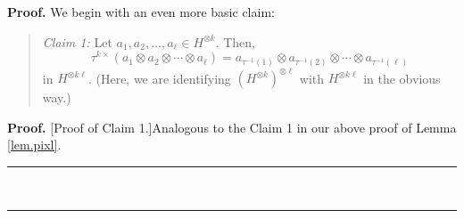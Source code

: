 \documentclass[numbers=enddot,12pt,final,onecolumn,notitlepage]{scrartcl}%
\theoremstyle{definition}
\newenvironment{statement}{\begin{quote}}{\end{quote}}
\newenvironment{proof}[1][Proof]{\noindent\textbf{#1.} }{\ \rule{0.5em}{0.5em}}
\begin{document}
\begin{proof}
We begin with an even more basic claim:

\begin{statement}
\textit{Claim 1:} Let $a_{1},a_{2},\ldots,a_{\ell}\in H^{\otimes k}$. Then,%
\[
\tau^{k\times}\left(  a_{1}\otimes a_{2}\otimes\cdots\otimes a_{\ell}\right)
=a_{\tau^{-1}\left(  1\right)  }\otimes a_{\tau^{-1}\left(  2\right)  }%
\otimes\cdots\otimes a_{\tau^{-1}\left(  \ell\right)  }%
\]
in $H^{\otimes k\ell}$. (Here, we are identifying $\left(  H^{\otimes
k}\right)  ^{\otimes\ell}$ with $H^{\otimes k\ell}$ in the obvious way.)
\end{statement}

\begin{proof}
[Proof of Claim 1.]Analogous to the Claim 1 in our above proof of Lemma
\ref{lem.pixl}.
\end{proof}


\end{proof}
\end{document}

